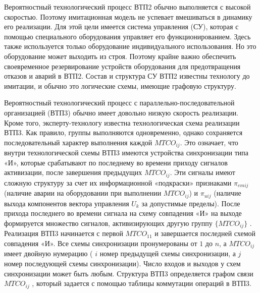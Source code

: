 Вероятностный технологический процесс ВТП2 обычно выполняется с высокой скоростью. Поэтому имитационная модель не успевает вмешиваться в динамику его реализации. Для этой цели имеется система управления (СУ), которая с помощью специального оборудования управляет его функционированием. Здесь также используется только оборудование индивидуального использования. Но это оборудование может выходить из строя. Поэтому крайне важно обеспечить своевременное резервирование устройств оборудования для предотвращения отказов и аварий в ВТП2. Состав и структура СУ ВТП2 известны технологу до имитации, и обычно это логические схемы, имеющие графовую структуру.

Вероятностный технологический процесс с параллельно-последовательной организацией (ВТП3) обычно имеет довольно низкую скорость реализации. Кроме того, эксперту-технологу известна технологическая схема реализации ВТП3. Как правило, группы   выполняются одновременно, однако сохраняется последовательный характер выполнения каждой $MTCO_{ij}$. Это означает, что внутри технологической схемы ВТП3 имеются устройства синхронизации типа «И», которые срабатывают по последнему во времени приходу сигналов активизации, после завершения предыдущих $MTCO_{ij}$. Эти сигналы имеют сложную структуру за счет их информационной «подкраски» признаками $\pi_{emij}$ (наличие аварии на оборудовании при выполнении  $MTCO_{ij}$) и $\pi_{uij}$ (наличие выхода компонентов вектора управления ${U_k}$ за допустимые пределы). После прихода последнего во времени сигнала на схему совпадения «И» на выходе формируется множество сигналов, активизирующих другую группу $\{MTCO_{ij}\}$ . Реализация ВТП3 начинается с первой $MTCO_{11}$ и завершается последней схемой совпадения «И». Все схемы синхронизации пронумерованы от $1$ до $n$, а $MTCO_{ij}$ имеет двойную нумерацию ( $i$ номер предыдущей схемы синхронизации, а $j$ номер последующей схемы синхронизации). Число входов и выходов у схем синхронизации может быть любым. Структура ВТП3 определяется графом связи $MTCO_{ij}$ , который задается с помощью таблицы коммутации операций в ВТП3.

